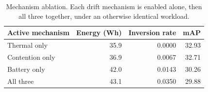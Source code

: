 
\begin{table}[t]
  \centering
  \caption{Mechanism ablation. Each drift mechanism is enabled alone, then
    all three together, under an otherwise identical workload.}
  \label{tab:mechanism-ablation}
  \footnotesize
  \setlength{\tabcolsep}{4pt}
  \begin{tabular}{lrrr}
    \toprule
    Active mechanism & Energy (Wh) & Inversion rate & mAP \\
    \midrule
    Thermal only & 35.9 & 0.0000 & 32.93 \\
    Contention only & 36.9 & 0.0067 & 32.71 \\
    Battery only & 42.0 & 0.0143 & 30.26 \\
    All three & 43.1 & 0.0350 & 29.88 \\
    \bottomrule
  \end{tabular}
\end{table}
